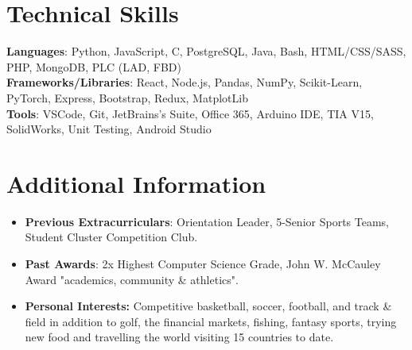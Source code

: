 \documentclass[letterpaper,11pt]{article}
\newcommand{\resumeItem}[1]{
  \item\small{
    {#1 \vspace{-2pt}}
  }
}
\newcommand{\resumeItemListStart}{\begin{itemize}}
\newcommand{\resumeItemListEnd}{\end{itemize}\vspace{-5pt}}
\begin{document}
\section{Technical Skills}
 \begin{itemize}[leftmargin=0.15in, label={}]
    \small{\item{
     \textbf{Languages}{: Python, JavaScript, C, PostgreSQL, Java, Bash, HTML/CSS/SASS, PHP, MongoDB, PLC (LAD, FBD)} \\
     \textbf{Frameworks/Libraries}{: React, Node.js, Pandas, NumPy, Scikit-Learn, PyTorch, Express, Bootstrap, Redux, MatplotLib} \\
     \textbf{Tools}{: VSCode, Git, JetBrains’s Suite, Office 365, Arduino IDE, TIA V15, SolidWorks, Unit Testing, Android Studio} \\
    }}
 \end{itemize}
 \vspace{-16pt}


\section{Additional Information}
            \resumeItemListStart
                \resumeItem{\textbf{Previous Extracurriculars}: Orientation Leader, 5-Senior Sports Teams, Student Cluster Competition Club.}
                 \vspace{-5pt}
                \resumeItem{\textbf{Past Awards}: 2x Highest Computer Science Grade, John W. McCauley Award "academics, community \& athletics".}
                \vspace{-15pt}
                \resumeItem{\textbf{Personal Interests:} Competitive basketball, soccer, football, and track \& field in addition to golf, the financial markets, fishing, fantasy sports, trying new food and travelling the world visiting 15 countries to date. }
            \resumeItemListEnd
\end{document}
